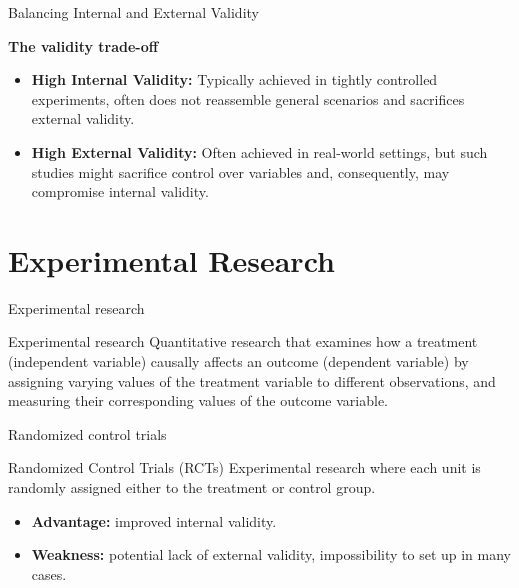 \documentclass[aspectratio=169]{beamer}
\begin{document}
\begin{frame}{Balancing Internal and External Validity}

\begin{center}
    \textbf{The validity trade-off}
\end{center}
\vspace{0.3cm}

\begin{itemize}
    \item \textbf{High Internal Validity:} Typically achieved in tightly controlled experiments, often does not reassemble general scenarios and sacrifices external validity.
    \item \textbf{High External Validity:} Often achieved in real-world settings, but such studies might sacrifice control over variables and, consequently, may compromise internal validity.
\end{itemize}
    
\end{frame}

\section{\Large Experimental Research}

\begin{frame}{Experimental research}

    \begin{coolblock}{Experimental research}
        Quantitative research that examines how a treatment (independent variable) causally affects an outcome (dependent variable) by assigning varying values of the treatment variable to different observations, and measuring their corresponding values of the outcome variable.
    \end{coolblock}
    
\end{frame}

\begin{frame}{Randomized control trials}

    \begin{coolblock}{Randomized Control Trials (RCTs)}
        Experimental research where each unit is randomly assigned either to the treatment or control group.
    \end{coolblock}
    \vspace{0.3cm}

    \begin{itemize}
        \item \textbf{Advantage:} improved internal validity. 
        \item \textbf{Weakness:} potential lack of external validity, impossibility to set up in many cases.
    \end{itemize}
    
\end{frame}
\end{document}
